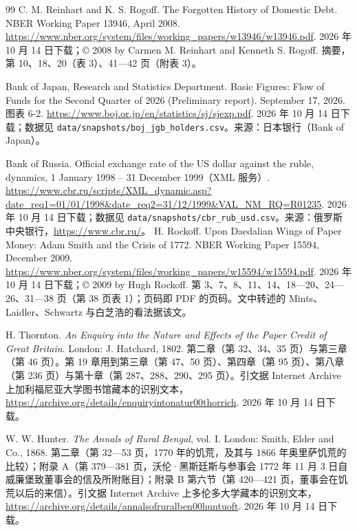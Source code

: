 \begin{thebibliography}{99}
 C. M. Reinhart and K. S. Rogoff. The Forgotten History of Domestic Debt. NBER Working Paper 13946, April 2008. \url{https://www.nber.org/system/files/working_papers/w13946/w13946.pdf}. 2026 年 10 月 14 日下载；© 2008 by Carmen M. Reinhart and Kenneth S. Rogoff. 摘要，第 10、18、20（表 3）、41—42 页（附表 3）。

 Bank of Japan, Research and Statistics Department. Basic Figures: Flow of Funds for the Second Quarter of 2026 (Preliminary report). September 17, 2026. 图表 6-2. \url{https://www.boj.or.jp/en/statistics/sj/sjexp.pdf}. 2026 年 10 月 14 日下载；数据见 \texttt{data/snapshots/boj\_jgb\_holders.csv}。来源：日本银行（Bank of Japan）。

 Bank of Russia. Official exchange rate of the US dollar against the ruble, dynamics, 1 January 1998 -- 31 December 1999（XML 服务）. \url{https://www.cbr.ru/scripts/XML_dynamic.asp?date_req1=01/01/1998&date_req2=31/12/1999&VAL_NM_RQ=R01235}. 2026 年 10 月 14 日下载；数据见 \texttt{data/snapshots/cbr\_rub\_usd.csv}。来源：俄罗斯中央银行，\url{https://www.cbr.ru/}。
 H. Rockoff. Upon Daedalian Wings of Paper Money: Adam Smith and the Crisis of 1772. NBER Working Paper 15594, December 2009. \url{https://www.nber.org/system/files/working_papers/w15594/w15594.pdf}. 2026 年 10 月 14 日下载；© 2009 by Hugh Rockoff. 第 3、7、8、11、14、18—20、24—26、31—38 页（第 38 页表 1）；页码即 PDF 的页码。文中转述的 Mints、Laidler、Schwartz 与白芝浩的看法据该文。

 H. Thornton. \emph{An Enquiry into the Nature and Effects of the Paper Credit of Great Britain}. London: J. Hatchard, 1802. 第二章（第 32、34、35 页）与第三章（第 46 页）。第 19 章用到第三章（第 47、50 页）、第四章（第 95 页）、第八章（第 236 页）与第十章（第 287、288、290、295 页）。引文据 Internet Archive 上加利福尼亚大学图书馆藏本的识别文本，\url{https://archive.org/details/enquiryintonatur00thorrich}. 2026 年 10 月 14 日下载。

 W. W. Hunter. \emph{The Annals of Rural Bengal}, vol. I. London: Smith, Elder and Co., 1868. 第二章（第 32—53 页，1770 年的饥荒，及其与 1866 年奥里萨饥荒的比较）；附录 A（第 379—381 页，沃伦·黑斯廷斯与参事会 1772 年 11 月 3 日自威廉堡致董事会的信及所附账目）；附录 B 第六节（第 420—421 页，董事会在饥荒以后的来信）。引文据 Internet Archive 上多伦多大学藏本的识别文本，\url{https://archive.org/details/annalsofruralben00huntuoft}. 2026 年 10 月 14 日下载。


\end{thebibliography}
